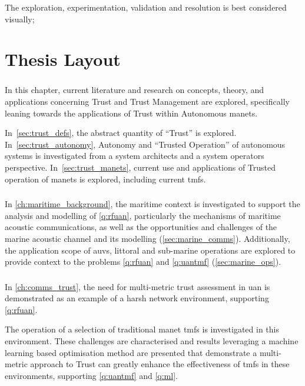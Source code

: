 The exploration, experimentation, validation and resolution is best considered visually;


\section{Thesis Layout}

\subsubsection{}
In this chapter, current literature and research on concepts, theory, and applications concerning Trust and Trust Management are explored, specifically leaning towards the applications of Trust within Autonomous \glspl{manet}.

In~\autoref{sec:trust_defs}, the abstract quantity of ``Trust'' is explored.
In~\autoref{sec:trust_autonomy}, Autonomy and ``Trusted Operation'' of autonomous systems is investigated from a system architects and a system operators perspective.
In~\autoref{sec:trust_manets}, current use and applications of Trusted operation of \glspl{manet} is explored, including current \glspl{tmf}.

\subsubsection{}
In \autoref{ch:maritime_background}, the maritime context is investigated to support the analysis and modelling of \ref{q:rfuan}, particularly the mechanisms of maritime acoustic communications, as well as the opportunities and challenges of the marine acoustic channel and its modelling (\autoref{sec:marine_comms}).
Additionally, the application scope of \glspl{auv}, littoral and sub-marine operations are explored to provide context to the problems \ref{q:rfuan} and \ref{q:uantmf} (\autoref{sec:marine_ops}).

\subsubsection{}
In \autoref{ch:comms_trust}, the need for multi-metric trust assessment in \gls{uan} is demonstrated as an example of a harsh network environment, supporting \ref{q:rfuan}.

The operation of a selection of traditional \gls{manet} \glspl{tmf} is investigated in this environment.
These challenges are characterised and results leveraging a machine learning based optimisation method are presented that demonstrate a multi-metric approach to Trust can greatly enhance the effectiveness of \glspl{tmf} in these environments, supporting \ref{q:uantmf} and \ref{q:ml}.

